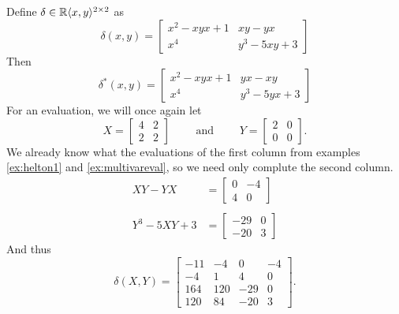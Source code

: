 \begin{example}
  Define \(\delta \in \mathbb{R} \langle x,y \rangle ^{2\times 2}\) as
  \[
    \delta(x,y) = \begin{bmatrix}
               x^2-xyx+1 & xy-yx \\
               x^4 & y^3-5xy+3
        \end{bmatrix}
  \]
  Then
  \[
    \delta^*(x,y) = \begin{bmatrix}
               x^2-xyx+1 & yx-xy \\
               x^4 & y^3-5yx+3
        \end{bmatrix}
  \]
  For an evaluation, we will once again let
  \[
    X = \begin{bmatrix} 4 &2\\2&2 \end{bmatrix}  \qquad \text{ and } \qquad Y =\begin{bmatrix} 2&0\\0&0 \end{bmatrix}.
  \]
  We already know what the evaluations of the first column from examples
  \ref{ex:helton1} and \ref{ex:multivareval}, so we need only complute the
  second column.
  \begin{align*}
    XY-YX &= \begin{bmatrix} 0&-4\\4&0 \end{bmatrix}  \\
    \\
    Y^3-5XY+3 &= \begin{bmatrix} -29&0\\-20&3 \end{bmatrix}
  \end{align*}
  And thus
  \[
    \delta(X,Y) =
    \begin{bmatrix}
      -11&-4&0&-4 \\
      -4&1&4&0 \\
      164&120&-29&0\\
      120&84&-20&3
    \end{bmatrix}.
  \]
\end{example}

